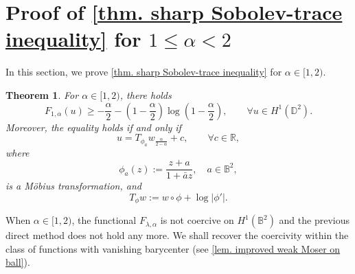 \documentclass[11pt,a4paper,twoside]{amsart}
\newtheorem{theorem}{Theorem} [section]
\newtheorem{sketch proof}{Sketch of the proof}[section]
\begin{document}
    \section{Proof of \cref{thm. sharp Sobolev-trace inequality} for $1\leq \alpha<2$}
    \label{sec. functional ineq for large alpha}
    In this section, we prove \cref{thm. sharp Sobolev-trace inequality} for $\alpha\in[1,2)$.
    \begin{theorem}\label{thm. functional ineq for alpha larger than 1}
        For  $\alpha\in[1,2)$, there holds
        \[
        F_{1,\alpha}(u)
        \geq -\frac{\alpha}{2}
        -\left(1-\frac{\alpha}{2}\right)
        \log\left(1-\frac{\alpha}{2}\right),\qquad 
        \forall u\in H^1(\mathbb{D}^2).
        \]
        Moreover, the equality holds if and only if
        \begin{equation*}
            u=T_{\phi_a}w_{\frac{\alpha}{2-\alpha}}+c,\qquad \forall c\in\mathbb{R},
        \end{equation*}
        where  
        \[
        \phi_a(z):=\frac{z+a}{1+\bar{a}z},\quad a\in\mathbb{B}^2,
        \]
        is a M\"obius transformation, and 
        \[
        T_\phi w:=w\circ\phi+\log |\phi'|.
        \]
    \end{theorem}
    When $\alpha\in[1,2)$, the functional $F_{\lambda,\alpha}$ is not coercive on $H^1(\mathbb{B}^2)$ and the previous direct method does not hold any more. We shall recover the coercivity within the class of functions with vanishing barycenter (see \cref{lem. improved weak Moser on ball}).

    
\end{document}
